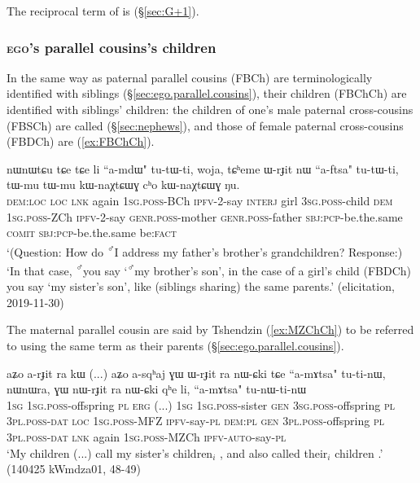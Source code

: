 The reciprocal term of  is  (§\ref{sec:G+1}).

\subsubsection{\textsc{ego}'s parallel cousins's children} \label{sec:FBCh.MZCh.Ch}
In the same way as paternal parallel cousins (FBCh) are terminologically identified with siblings (§\ref{sec:ego.parallel.cousins}), their children (FBChCh) are identified with siblings' children: the children of one's male paternal cross-cousins (FBSCh) are called  (§\ref{sec:nephews}), and those of female paternal cross-cousins (FBDCh) are  (\ref{ex:FBChCh}).

\begin{exe}
\ex \label{ex:FBChCh}
\gll nɯnɯtɕu tɕe tɕe li ``a-mdɯ" tu-tɯ-ti, woja, tɕʰeme ɯ-rɟit nɯ ``a-ftsa" tu-tɯ-ti, tɯ-mu tɯ-mu kɯ-naχtɕɯɣ cʰo kɯ-naχtɕɯɣ ŋu. \\
\textsc{dem}:\textsc{loc} \textsc{loc} \textsc{lnk} again \textsc{1sg}.\textsc{poss}-BCh \textsc{ipfv}-2-say \textsc{interj} girl \textsc{3sg}.\textsc{poss}-child \textsc{dem} \textsc{1sg}.\textsc{poss}-ZCh  \textsc{ipfv}-2-say \textsc{genr}.\textsc{poss}-mother \textsc{genr}.\textsc{poss}-father \textsc{sbj}:\textsc{pcp}-be.the.same \textsc{comit} \textsc{sbj}:\textsc{pcp}-be.the.same be:\textsc{fact} \\
\glt `(Question: How do \textsuperscript{♂}I address  my father's brother's grandchildren? Response:) `In that case, \textsuperscript{♂}you say  `\textsuperscript{♂}my brother's son', in the case of a girl's child (FBDCh) you say  `my sister's son', like (siblings sharing) the same parents.' (elicitation, 2019-11-30)
\end{exe}

The maternal parallel cousin are said by Tshendzin (\ref{ex:MZChCh}) to be referred to using the same term as their parents  (§\ref{sec:ego.parallel.cousins}).

\begin{exe}
\ex \label{ex:MZChCh}
\gll aʑo a-rɟit ra kɯ (...) aʑo a-sqʰaj ɣɯ ɯ-rɟit ra nɯ-ɕki  tɕe ``a-mɤtsa" tu-ti-nɯ, nɯnɯra, ɣɯ nɯ-rɟit ra nɯ-ɕki qʰe li, ``a-mɤtsa" tu-nɯ-ti-nɯ  \\
\textsc{1sg} \textsc{1sg}.\textsc{poss}-offspring \textsc{pl} \textsc{erg} (...) \textsc{1sg} \textsc{1sg}.\textsc{poss}-sister \textsc{gen} \textsc{3sg}.\textsc{poss}-offspring \textsc{pl} \textsc{3pl}.\textsc{poss}-\textsc{dat} \textsc{loc} \textsc{1sg}.\textsc{poss}-MFZ \textsc{ipfv}-say-\textsc{pl} \textsc{dem}:\textsc{pl} \textsc{gen} \textsc{3pl}.\textsc{poss}-offspring \textsc{pl} \textsc{3pl}.\textsc{poss}-\textsc{dat} \textsc{lnk} again \textsc{1sg}.\textsc{poss}-MZCh \textsc{ipfv}-\textsc{auto}-say-\textsc{pl} \\
\glt `My children (...) call my sister's children$_i$ , and also called their$_i$ children .' (140425 kWmdza01, 48-49)
\end{exe}

